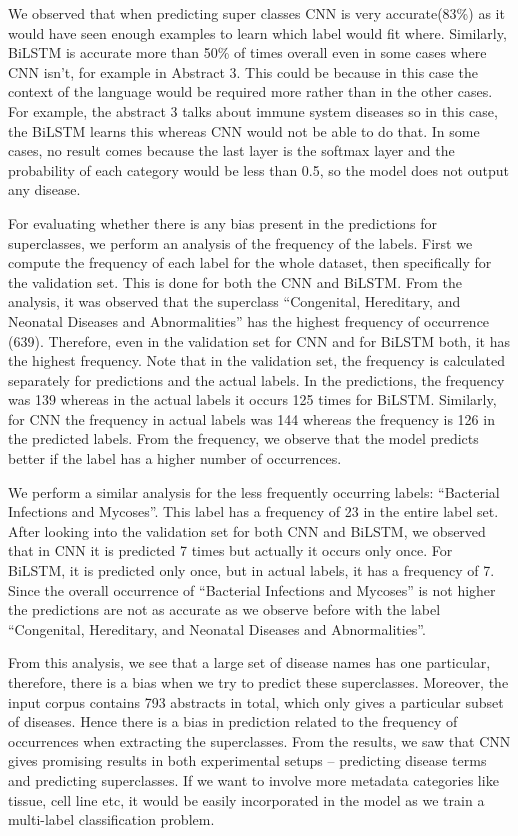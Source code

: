 We observed that when predicting super classes CNN is very accurate(83\%) as it would have seen enough examples to learn which label would fit where. Similarly, BiLSTM is accurate more than 50\% of times overall even in some cases where CNN isn't, for example in Abstract 3. This could be because in this case the context of the language would be required more rather than in the other cases. For example, the abstract 3 talks about immune system diseases so in this case, the BiLSTM learns this whereas CNN would not be able to do that.  
In some cases, no result comes because the last layer is the softmax layer and the probability of each category would be less than 0.5, so the model does not output any disease.

For evaluating whether there is any bias present in the predictions for superclasses, we perform an analysis of the frequency of the labels. First we compute the frequency of each label for the whole dataset, then specifically for the validation set. This is done for both the CNN and BiLSTM. 
From the analysis, it was observed that the superclass ``Congenital, Hereditary, and Neonatal Diseases and Abnormalities'' has the highest frequency of occurrence (639). Therefore, even in the validation set for CNN and for BiLSTM both, it has the highest frequency. Note that in the validation set, the frequency is calculated separately for predictions and the actual labels. In the predictions, the frequency was 139 whereas in the actual labels it occurs 125 times for BiLSTM. Similarly, for CNN the frequency in actual labels was 144 whereas the frequency is 126 in the predicted labels. From the frequency, we observe that the model predicts better if the label has a higher number of occurrences. 

We perform a similar analysis for the less frequently occurring labels: ``Bacterial Infections and Mycoses''. This label has a frequency of 23 in the entire label set. After looking into the validation set for both CNN and BiLSTM, we observed that in CNN it is predicted 7 times but actually it occurs only once. For BiLSTM, it is predicted only once, but in actual labels, it has a frequency of 7. Since the overall occurrence of ``Bacterial Infections and Mycoses'' is not higher the predictions are not as accurate as we observe before with the label ``Congenital, Hereditary, and Neonatal Diseases and Abnormalities''.  

From this analysis, we see that a large set of disease names has one particular, therefore, there is a bias when we try to predict these superclasses. Moreover, the input corpus contains 793 abstracts in total, which only gives a particular subset of diseases. Hence there is a bias in prediction related to the frequency of occurrences when extracting the superclasses. From the results, we saw that CNN gives promising results in both experimental setups -- predicting disease terms and predicting superclasses. If we want to involve more metadata categories like tissue, cell line etc, it would be easily incorporated in the model as we train a multi-label classification problem. 





